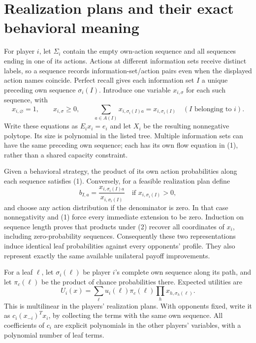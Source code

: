 \documentclass[11pt]{article}
\begin{document}
\section*{Realization plans and their exact behavioral meaning}
For player $i$, let $\Sigma_i$ contain the empty own-action sequence and
all sequences ending in one of its actions. Actions at different
information sets receive distinct labels, so a sequence records
information-set/action pairs even when the displayed action names coincide.
Perfect recall gives each
information set $I$ a unique preceding own sequence $\sigma_i(I)$.
Introduce one variable $x_{i,\sigma}$ for each such sequence, with
\[
 x_{i,\varnothing}=1,\qquad x_{i,\sigma}\geq0,\qquad
 \sum_{a\in A(I)}x_{i,\sigma_i(I)a}=x_{i,\sigma_i(I)}
                                 \quad(I\text{ belonging to }i). \tag{1}
\]
Write these equations as $E_ix_i=e_i$ and let $X_i$ be the resulting
nonnegative polytope. Its size is polynomial in the listed tree. Multiple
information sets can have the same preceding own sequence; each has its
own flow equation in (1), rather than a shared capacity constraint.

Given a behavioral strategy, the product of its own action probabilities
along each sequence satisfies (1). Conversely, for a feasible realization
plan define
\[
 b_{I,a}=\frac{x_{i,\sigma_i(I)a}}{x_{i,\sigma_i(I)}}
                          \quad\text{if }x_{i,\sigma_i(I)}>0,     \tag{2}
\]
and choose any action distribution if the denominator is zero. In that
case nonnegativity and (1) force every immediate extension to be zero.
Induction on sequence length proves that products under (2) recover all
coordinates of $x_i$, including zero-probability sequences. Consequently
these two representations induce identical leaf probabilities against
every opponents' profile. They also represent exactly the same available
unilateral payoff improvements.

For a leaf $\ell$, let $\sigma_i(\ell)$ be player $i$'s complete own
sequence along its path, and let $\pi_c(\ell)$ be the product of chance
probabilities there. Expected utilities are
\[
 U_i(x)=\sum_{\ell}u_i(\ell)\pi_c(\ell)
                            \prod_h x_{h,\sigma_h(\ell)}.         \tag{3}
\]
This is multilinear in the players' realization plans. With opponents
fixed, write it as $c_i(x_{-i})^Tx_i$, by collecting the terms with the
same own sequence. All coefficients of $c_i$ are explicit polynomials
in the other players' variables, with a polynomial number of leaf terms.
\end{document}
